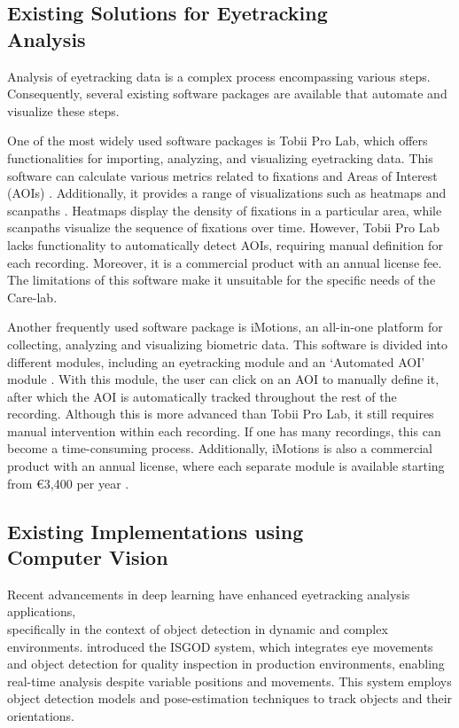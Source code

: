 \documentclass[english]{hogent-article}
\begin{document}
\subsection{Existing Solutions for Eyetracking\\ Analysis}

Analysis of eyetracking data is a complex process encompassing various steps. 
Consequently, several existing software packages are available that automate and visualize these steps.

One of the most widely used software packages is Tobii Pro Lab, which offers functionalities for importing, analyzing, and visualizing eyetracking data.
This software can calculate various metrics related to fixations and Areas of Interest (AOIs) \autocite{Tobii2025a}.
Additionally, it provides a range of visualizations such as heatmaps and scanpaths \autocite{Tobii2025b}. 
Heatmaps display the density of fixations in a particular area, while scanpaths visualize the sequence of fixations over time.
However, Tobii Pro Lab lacks functionality to automatically detect AOIs, requiring manual definition for each recording.
Moreover, it is a commercial product with an annual license fee. 
The limitations of this software make it unsuitable for the specific needs of the Care-lab.

Another frequently used software package is iMotions, an all-in-one platform for collecting, analyzing and visualizing biometric data.
This software is divided into different modules, including an eyetracking module and an `Automated AOI' module \autocite{iMotions2025a}.
With this module, the user can click on an AOI to manually define it, after which the AOI is automatically tracked throughout the rest of the recording.
Although this is more advanced than Tobii Pro Lab, it still requires manual intervention within each recording. If one has many recordings, this can become a time-consuming process.
Additionally, iMotions is also a commercial product with an annual license, where each separate module is available starting from €3,400 per year \autocite{iMotions2025b}.

\subsection{Existing Implementations using\\ Computer Vision}

Recent advancements in deep learning have enhanced eyetracking analysis applications,\\ specifically in the context of object detection in dynamic and complex environments.
\textcite{Cho2024} introduced the ISGOD system, which integrates eye movements and object detection for quality inspection in production 
environments, enabling real-time analysis despite variable positions and movements. 
This system employs object detection models and pose-estimation techniques to track objects and their orientations.
\end{document}
